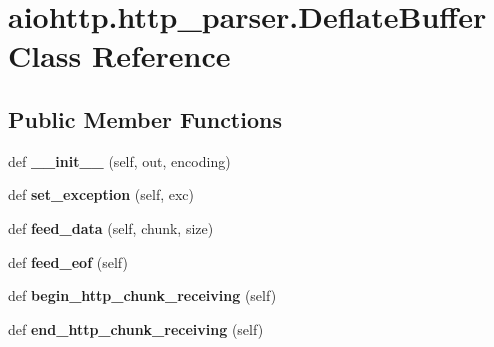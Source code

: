 \hypertarget{classaiohttp_1_1http__parser_1_1_deflate_buffer}{}\section{aiohttp.\+http\+\_\+parser.\+Deflate\+Buffer Class Reference}
\label{classaiohttp_1_1http__parser_1_1_deflate_buffer}
\subsection*{Public Member Functions}
\begin{DoxyCompactItemize}
\item 
\mbox{\label{classaiohttp_1_1http__parser_1_1_deflate_buffer_a23403a73410e1e7c9304e48c1986cc11}} 
def {\bfseries \+\_\+\+\_\+init\+\_\+\+\_\+} (self, out, encoding)
\item 
\mbox{\label{classaiohttp_1_1http__parser_1_1_deflate_buffer_a4698bfb44c9585f84ecde42f0536000a}} 
def {\bfseries set\+\_\+exception} (self, exc)
\item 
\mbox{\label{classaiohttp_1_1http__parser_1_1_deflate_buffer_a97d4f86369b12134dba76e17a40a1c4a}} 
def {\bfseries feed\+\_\+data} (self, chunk, size)
\item 
\mbox{\label{classaiohttp_1_1http__parser_1_1_deflate_buffer_a7206a82e8e7b36ca7a67a6a8a0c4fbe0}} 
def {\bfseries feed\+\_\+eof} (self)
\item 
\mbox{\label{classaiohttp_1_1http__parser_1_1_deflate_buffer_a31441ede084bc8381f32967c53dd32cf}} 
def {\bfseries begin\+\_\+http\+\_\+chunk\+\_\+receiving} (self)
\item 
\mbox{\label{classaiohttp_1_1http__parser_1_1_deflate_buffer_a02c19c27f967e105152959ecee601fc7}} 
def {\bfseries end\+\_\+http\+\_\+chunk\+\_\+receiving} (self)
\end{DoxyCompactItemize}
